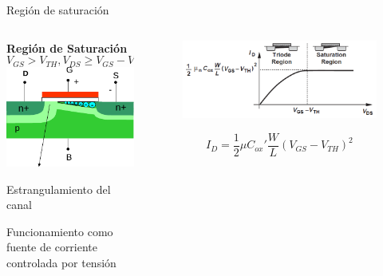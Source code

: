 \documentclass[t,aspectratio=169,10pt]{beamer}
\begin{document}
\begin{frame}{Región de saturación}

\begin{columns}

	\begin{column}{0.5\textwidth}

		\centering
		\textbf{Región de Saturación}
		\[ V_{GS} > V_{TH}, V_{DS} \geq V_{GS} - V_{TH} \]
		\includegraphics[width=5cm]{satura}
		
		Estrangulamiento del canal
		
		\vspace{3mm}
		Funcionamiento como fuente de corriente controlada por tensión
 
	\end{column}
 
	\begin{column}{0.5\textwidth}
 
        \begin{figure}
            \centering
            \includegraphics[width=\textwidth]{figuras/region_saturacion.png}
        \end{figure}

        \[ I_D = \dfrac{1}{2} \mu {}C_{ox}' \dfrac{W}{L} (V_{GS}-V_{TH})^2 \]
  
	\end{column}
 
\end{columns}

\end{frame}
\end{document}
